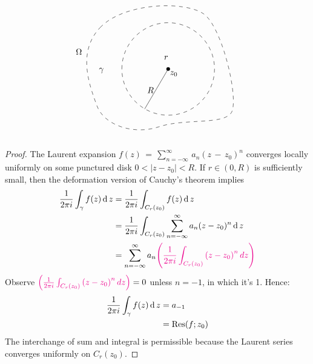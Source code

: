 \documentclass[12pt]{article}
\renewcommand{\d}{\ensuremath{\operatorname{d}}}
\begin{document}
\begin{theorem}
\[\begin{tikzpicture}[x=0.75pt,y=0.75pt,yscale=-0.7,xscale=.7]
        \draw [shift={(282.02,158.43)}, rotate = 90] [color=black  ][fill=black  ][line width=0.75]      (0, 0) circle [x radius= 3.35, y radius= 3.35]   ;
        \draw  [dash pattern={on 4.5pt off 4.5pt}] (178.08,158.43) .. controls (178.08,101.02) and (224.62,54.49) .. (282.02,54.49) .. controls (339.42,54.49) and (385.95,101.02) .. (385.95,158.43) .. controls (385.95,215.83) and (339.42,262.36) .. (282.02,262.36) .. controls (224.62,262.36) and (178.08,215.83) .. (178.08,158.43) -- cycle ;
        \draw    (282.02,158.43) -- (229.26,248.39) ;
        \draw  [dash pattern={on 4.5pt off 4.5pt}] (129.26,65.39) .. controls (182.26,9.39) and (318.51,4.79) .. (361.26,34.39) .. controls (404,64) and (442.26,230.39) .. (423.26,257.39) .. controls (404.26,284.39) and (317.26,269.39) .. (261.26,288.39) .. controls (205.26,307.39) and (138.26,285.39) .. (122.26,241.39) .. controls (106.26,197.39) and (76.26,121.39) .. (129.26,65.39) -- cycle ;
        
        \draw (284.02,161.83) node [anchor=north west][inner sep=0.75pt]    {$z_{0}$};
        \draw (270.95,127.47) node [anchor=north west][inner sep=0.75pt]    {$r$};
        \draw (233.26,197.79) node [anchor=north west][inner sep=0.75pt]    {$R$};
        \draw (125,154.4) node [anchor=north west][inner sep=0.75pt]    {$\gamma $};
        \draw (73,111.4) node [anchor=north west][inner sep=0.75pt]    {$\Omega $};
        
        
        \end{tikzpicture}
        \]
\end{theorem}
\begin{proof}
    The Laurent expansion $f(z)\,=\,\sum_{n=-\infty}^{\infty}\,a_{n}(z\,-\,z_{0})^{n}$ converges locally uniformly on some punctured disk $0 < |z - z_0| < R$. If $r \in (0, R)$ is sufficiently small, then the deformation version of Cauchy's theorem implies \begin{align*}
        \frac{1}{2\pi i}\int_{\gamma}f(z)\d z&=\frac{1}{2\pi i}\int_{C_{r}(z_{0})}f(z)\d z\\
        &=\frac{1}{2\pi i}\int_{C_{r}(z_{0})}\sum_{n=-\infty}^{\infty}a_{n}(z-z_{0})^{n}\d z\\
        &= \sum_{n=-\infty}^{\infty}a_{n}\rt{\left(\frac{1}{2\pi i}\int_{C_{r}(z_{0})}^{}\left(z-z_{0}\right)^{n}d z\right)}
    \end{align*}
    Observe \(\textcolor{magenta}{\left(\frac{1}{2\pi i}\int_{C_{r}(z_{0})}^{}\left(z-z_{0}\right)^{n}d z\right)}=0\) unless $n=-1$, in which it's 1. Hence:
    \begin{align*}
        \frac{1}{2\pi i}\int_{\gamma}f(z)\d z&= a_{-1}\\
        &=\Res(f;z_0)
    \end{align*}
    The interchange of sum and integral is permissible because the Laurent series converges uniformly on $C_{r}(z_0)$.
\end{proof}
\end{document}
